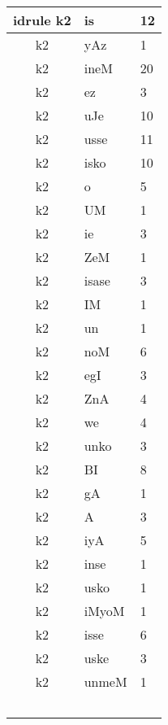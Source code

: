 \documentclass[a4 paper]{article}
\begin{document}
\begin{longtable}{cp{}p{}}
idrule k2 & is & 12\\ \midrule k2 & yAz & 1\\ \midrule k2 & ineM & 20\\ \midrule k2 & ez & 3\\ \midrule k2 & uJe & 10\\ \midrule k2 & usse & 11\\ \midrule k2 & isko & 10\\ \midrule k2 & o & 5\\ \midrule k2 & UM & 1\\ \midrule k2 & ie & 3\\ \midrule k2 & ZeM & 1\\ \midrule k2 & isase & 3\\ \midrule k2 & IM & 1\\ \midrule k2 & un & 1\\ \midrule k2 & noM & 6\\ \midrule k2 & egI & 3\\ \midrule k2 & ZnA & 4\\ \midrule k2 & we & 4\\ \midrule k2 & unko & 3\\ \midrule k2 & BI & 8\\ \midrule k2 & gA & 1\\ \midrule k2 & A & 3\\ \midrule k2 & iyA & 5\\ \midrule k2 & inse & 1\\ \midrule k2 & usko & 1\\ \midrule k2 & iMyoM & 1\\ \midrule k2 & isse & 6\\ \midrule k2 & uske & 3\\ \midrule k2 & unmeM & 1\\ \
\end{longtable}
\end{document}
